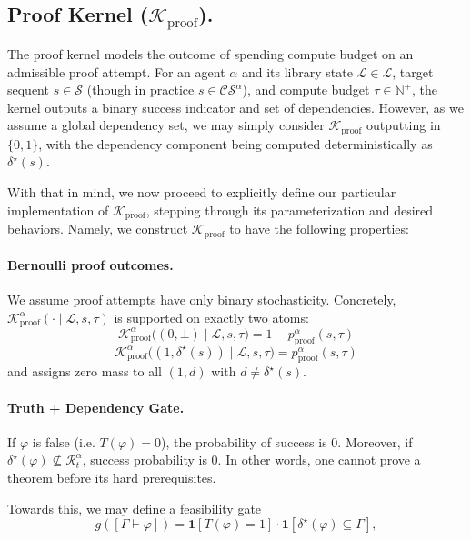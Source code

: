 \documentclass[letterpaper]{article} %
\renewcommand{\phi}{\varphi}
\newcommand{\proves}{\vdash}
\begin{document}
\subsection{Proof Kernel ($\mathcal{K}_{\text{proof}}$).}
The proof kernel models the outcome of spending compute budget on an admissible proof attempt. For an agent $\alpha$ and its library state $\mathcal{L}\in\mathscr{L}$, target sequent $s\in\mathcal S$ (though in practice $s \in \mathcal{CS}^{\alpha}$), and compute budget $\tau\in\mathbb N^+$, the kernel outputs a binary success indicator and set of dependencies. However, as we assume a global dependency set, we may simply consider $\mathcal{K}_{\text{proof}}$ outputting in $\{0,1\}$, with the dependency component being computed deterministically as $\delta^\star(s)$.

With that in mind, we now proceed to explicitly define our particular implementation of $\mathcal{K}_{\text{proof}}$, stepping through its parameterization and desired behaviors. Namely, we construct $\mathcal{K}_{\text{proof}}$ to have the following properties:

\paragraph{Bernoulli proof outcomes.}
We assume proof attempts have only binary stochasticity. Concretely, $\mathcal K^\alpha_{\mathrm{proof}}(\cdot\mid \mathcal{L}, s,\tau)$ is supported on exactly two atoms:
\[
\mathcal K^\alpha_{\mathrm{proof}}\big((0,\bot)\mid \mathcal{L}, s,\tau\big)=1-p^\alpha_{\mathrm{proof}}(s,\tau)\]
\[\mathcal K^\alpha_{\mathrm{proof}}\big((1,\delta^\star(s))\mid \mathcal{L}, s,\tau\big)=p^\alpha_{\mathrm{proof}}(s,\tau)
\]
and assigns zero mass to all $(1,d)$ with $d\neq \delta^\star(s)$.

\paragraph{Truth + Dependency Gate.} If $\phi$ is false (i.e. $T(\phi)=0$), the probability of success is $0$. Moreover, if $\delta^\star(\phi)\not\subseteq \mathcal{R}_t^\alpha$, success probability is 0. In other words, one cannot prove a theorem before its hard prerequisites.

Towards this, we may define a feasibility gate
\[
g([\Gamma\proves \phi])=\mathbf{1}[T(\phi)=1]\cdot \mathbf{1}[\delta^\star(\phi)\subseteq \Gamma],
\]
\end{document}
